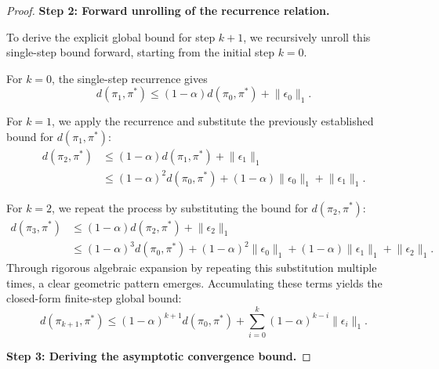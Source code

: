 \documentclass{article}
\theoremstyle{plain}
\theoremstyle{definition}
\theoremstyle{remark}
\begin{document}
\begin{proof}
	\textbf{Step 2: Forward unrolling of the recurrence relation.}
	
	To derive the explicit global bound for step $k+1$, we recursively unroll this single-step bound forward, starting from the initial step $k=0$.
	
	For $k=0$, the single-step recurrence gives
	\begin{equation}
		d(\pi_{1}, \pi^*) \leq(1-\alpha)d(\pi_0,\pi^*)+\lVert\epsilon_0\rVert_1.
	\end{equation}
	
	For $k=1$, we apply the recurrence and substitute the previously established bound for $d(\pi_{1}, \pi^*)$:
	\begin{equation}
		\begin{split}
			d(\pi_{2}, \pi^*) &\leq(1-\alpha)d(\pi_1,\pi^*)+\lVert\epsilon_1\rVert_1\\
			&\leq(1-\alpha)^2d(\pi_0,\pi^*)+(1-\alpha)\lVert\epsilon_0\rVert_1+\lVert\epsilon_1\rVert_1.
		\end{split}
	\end{equation}
	
	For $k=2$, we repeat the process by substituting the bound for $d(\pi_{2}, \pi^*)$:
	\begin{equation}
		\begin{split}
			d(\pi_{3}, \pi^*) &\leq(1-\alpha)d(\pi_2,\pi^*)+\lVert\epsilon_2\rVert_1\\
			&\leq(1-\alpha)^3d(\pi_0,\pi^*)+(1-\alpha)^2\lVert\epsilon_0\rVert_1+(1-\alpha)\lVert\epsilon_1\rVert_1+\lVert\epsilon_2\rVert_1.
		\end{split}
	\end{equation}
	Through rigorous algebraic expansion by repeating this substitution multiple times, a clear geometric pattern emerges. Accumulating these terms yields the closed-form finite-step global bound:
	\begin{equation}
		d(\pi_{k+1}, \pi^*)\leq(1-\alpha)^{k+1}d(\pi_0,\pi^*)+\sum_{i=0}^{k}(1-\alpha)^{k-i}\lVert\epsilon_i\rVert_1.
	\end{equation}
	
	\textbf{Step 3: Deriving the asymptotic convergence bound.}
	

\end{proof}
\end{document}
